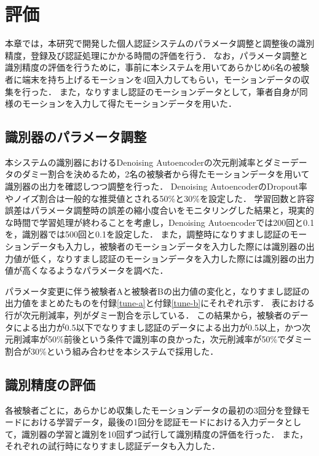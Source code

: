 \chapter{評価}
本章では，本研究で開発した個人認証システムのパラメータ調整と調整後の識別精度，登録及び認証処理にかかる時間の評価を行う．
なお，パラメータ調整と識別精度の評価を行うために，事前に本システムを用いてあらかじめ6名の被験者に端末を持ち上げるモーションを4回入力してもらい，モーションデータの収集を行った．
また，なりすまし認証のモーションデータとして，筆者自身が同様のモーションを入力して得たモーションデータを用いた．

\section{識別器のパラメータ調整}
本システムの識別器におけるDenoising Autoencoderの次元削減率とダミーデータのダミー割合を決めるため，2名の被験者から得たモーションデータを用いて識別器の出力を確認しつつ調整を行った．
Denoising AutoencoderのDropout率やノイズ割合は一般的な推奨値とされる50\%と30\%を設定した．
学習回数と許容誤差はパラメータ調整時の誤差の縮小度合いをモニタリングした結果と，現実的な時間で学習処理が終わることを考慮し，Denoising Autoencoderでは200回と0.1を，識別器では500回と0.1を設定した．
また，調整時になりすまし認証のモーションデータも入力し，被験者のモーションデータを入力した際には識別器の出力値が低く，なりすまし認証のモーションデータを入力した際には識別器の出力値が高くなるようなパラメータを調べた．

パラメータ変更に伴う被験者Aと被験者Bの出力値の変化と，なりすまし認証の出力値をまとめたものを付録\ref{tune-a}と付録\ref{tune-b}にそれぞれ示す．
表における行が次元削減率，列がダミー割合を示している．
この結果から，被験者のデータによる出力が0.5以下でなりすまし認証のデータによる出力が0.5以上，かつ次元削減率が50\%前後という条件で識別率の良かった，次元削減率が50\%でダミー割合が30\%という組み合わせを本システムで採用した．

\section{識別精度の評価}
各被験者ごとに，あらかじめ収集したモーションデータの最初の3回分を登録モードにおける学習データ，最後の1回分を認証モードにおける入力データとして，識別器の学習と識別を10回ずつ試行して識別精度の評価を行った．
また，それぞれの試行時になりすまし認証データも入力した．

